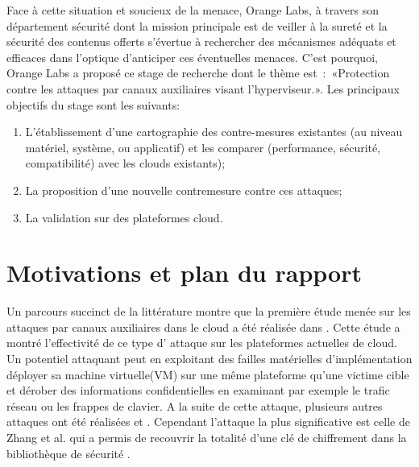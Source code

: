 Face à cette situation et soucieux de la menace,  Orange Labs,  à travers  son département sécurité dont la mission  principale est  de veiller à la sureté et la sécurité des contenus offerts s’évertue à rechercher des mécanismes adéquats  et efficaces dans l’optique d’anticiper ces éventuelles menaces. C’est pourquoi,
Orange Labs a proposé ce stage de recherche dont le thème est : «Protection contre les attaques par canaux auxiliaires visant l’hyperviseur.». Les principaux objectifs du stage sont les suivants:
\begin{enumerate}
\item L'établissement d'une cartographie des contre-mesures existantes (au niveau matériel, système, ou applicatif) et les comparer (performance, sécurité, compatibilité) avec les clouds existants);
\item La proposition d'une nouvelle contremesure contre ces attaques;
\item La validation sur des plateformes cloud.
\end{enumerate}    

\section{Motivations et plan du rapport}    
\label{sec:plan} 

Un parcours succinct de la littérature montre que la première étude menée  sur les attaques par canaux auxiliaires dans le cloud a été réalisée dans \cite{Ris2009}. Cette étude a montré l’effectivité de ce type d' attaque sur les plateformes actuelles de cloud.  Un potentiel attaquant peut  en exploitant des  failles matérielles d’implémentation  déployer sa machine virtuelle(VM) sur une même plateforme qu’une victime cible et dérober des informations confidentielles en examinant par exemple le trafic réseau ou les frappes de clavier. A la suite de cette attaque, plusieurs autres attaques ont été réalisées \cite{Zhang2012} et \cite{Yuval}. Cependant  l’attaque la plus significative  est celle de Zhang et al. \cite{Zhang2012}  qui a permis de recouvrir la totalité d’une clé de chiffrement dans la bibliothèque de sécurité \cite{gnupg}.\newline{}

